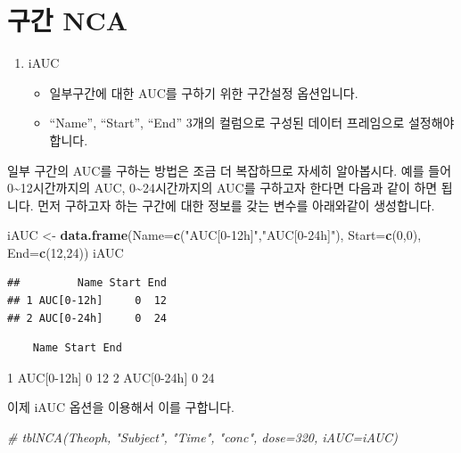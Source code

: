 \documentclass[
  10pt,
]{krantz}
\makeatletter
\newenvironment{Shaded}{\begin{snugshade}}{\end{snugshade}}
\newcommand{\CommentTok}[1]{\textcolor[rgb]{0.56,0.35,0.01}{\textit{#1}}}
\newcommand{\DataTypeTok}[1]{\textcolor[rgb]{0.13,0.29,0.53}{#1}}
\newcommand{\DecValTok}[1]{\textcolor[rgb]{0.00,0.00,0.81}{#1}}
\newcommand{\KeywordTok}[1]{\textcolor[rgb]{0.13,0.29,0.53}{\textbf{#1}}}
\newcommand{\NormalTok}[1]{#1}
\newcommand{\StringTok}[1]{\textcolor[rgb]{0.31,0.60,0.02}{#1}}
\providecommand{\tightlist}{%
  \setlength{\itemsep}{0pt}\setlength{\parskip}{0pt}}
\newenvironment{kframe}{%
\medskip{}
\setlength{\fboxsep}{.8em}
 \def\at@end@of@kframe{}%
 \ifinner\ifhmode%
  \def\at@end@of@kframe{\end{minipage}}%
  \begin{minipage}{\columnwidth}%
 \fi\fi%
 \def\FrameCommand##1{\hskip\@totalleftmargin \hskip-\fboxsep
 \colorbox{shadecolor}{##1}\hskip-\fboxsep
     \hskip-\linewidth \hskip-\@totalleftmargin \hskip\columnwidth}%
 \MakeFramed {\advance\hsize-\width
   \@totalleftmargin\z@ \linewidth\hsize
   \@setminipage}}%
 {\par\unskip\endMakeFramed%
 \at@end@of@kframe}
\renewenvironment{Shaded}{\begin{kframe}}{\end{kframe}}
\makeatother
\begin{document}
\hypertarget{interval-NCA}{%
\section{구간 NCA}\label{interval-NCA}}

\begin{enumerate}
\def\labelenumi{\arabic{enumi}.}
\tightlist
\item
  iAUC

  \begin{itemize}
  \tightlist
  \item
    일부구간에 대한 AUC를 구하기 위한 구간설정 옵션입니다.
  \item
    ``Name'', ``Start'', ``End'' 3개의 컬럼으로 구성된 데이터 프레임으로 설정해야 합니다.
  \end{itemize}
\end{enumerate}

일부 구간의 AUC를 구하는 방법은 조금 더 복잡하므로 자세히 알아봅시다.
예를 들어 0\textasciitilde12시간까지의 AUC, 0\textasciitilde24시간까지의 AUC를 구하고자 한다면 다음과 같이 하면 됩니다.
먼저 구하고자 하는 구간에 대한 정보를 갖는 변수를 아래와같이 생성합니다.

\begin{Shaded}
\begin{Highlighting}[]
\NormalTok{iAUC \textless{}{-}}\StringTok{ }\KeywordTok{data.frame}\NormalTok{(}\DataTypeTok{Name=}\KeywordTok{c}\NormalTok{(}\StringTok{"AUC[0{-}12h]"}\NormalTok{,}\StringTok{"AUC[0{-}24h]"}\NormalTok{), }\DataTypeTok{Start=}\KeywordTok{c}\NormalTok{(}\DecValTok{0}\NormalTok{,}\DecValTok{0}\NormalTok{), }\DataTypeTok{End=}\KeywordTok{c}\NormalTok{(}\DecValTok{12}\NormalTok{,}\DecValTok{24}\NormalTok{))}
\NormalTok{iAUC}
\end{Highlighting}
\end{Shaded}

\begin{verbatim}
##         Name Start End
## 1 AUC[0-12h]     0  12
## 2 AUC[0-24h]     0  24
\end{verbatim}

\begin{verbatim}
    Name Start End
\end{verbatim}

1 AUC{[}0-12h{]} 0 12
2 AUC{[}0-24h{]} 0 24

이제 iAUC 옵션을 이용해서 이를 구합니다.

\begin{Shaded}
\begin{Highlighting}[]
\CommentTok{\# tblNCA(Theoph, "Subject", "Time", "conc", dose=320, iAUC=iAUC)}
\end{Highlighting}
\end{Shaded}
\end{document}
